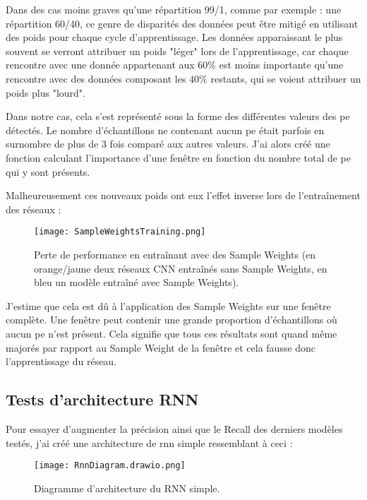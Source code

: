 Dans des cas moins graves qu'une répartition 99/1, comme par exemple : une répartition 60/40, ce genre de disparités
des données peut être mitigé en utilisant des poids pour chaque cycle d'apprentissage. Les données apparaissant le plus souvent 
se verront attribuer un poids "léger" lors de l'apprentissage, car chaque rencontre avec une donnée appartenant 
aux $60\%$ est moins importante qu'une rencontre avec des données composant les $40\%$ restants, qui se voient attribuer un poids plus "lourd".

Dans notre cas, cela s'est représenté sous la forme des différentes valeurs des \gls{pe} détectés. 
Le nombre d'échantillons ne contenant aucun \gls{pe} était parfois en surnombre de plus de 3 fois comparé aux autres valeurs. 
J'ai alors créé une fonction calculant l'importance d'une fenêtre en fonction du nombre total de \gls{pe} qui y sont présents.

Malheureusement ces nouveaux poids ont eux l'effet inverse lors de l'entraînement des réseaux :
\begin{figure}[tbph!]
	\centering
	\texttt{[image: SampleWeightsTraining.png]}
	\caption[Perte de performance en entraînant avec des Sample Weights]{Perte de performance en entraînant avec des Sample Weights (en orange/jaune deux réseaux CNN entraînés sans Sample Weights, en bleu un modèle entraîné avec Sample Weights).}
\end{figure}

J'estime que cela est dû à l'application des Sample Weights sur une fenêtre complète. Une fenêtre peut contenir 
une grande proportion d'échantillons où aucun \gls{pe} n'est présent. Cela signifie que tous ces résultats sont 
quand même majorés par rapport au Sample Weight de la fenêtre et cela fausse donc l'apprentissage du réseau.

\subsection{Tests d'architecture RNN}
Pour essayer d'augmenter la précision ainsi que le Recall des derniers modèles testés, j'ai créé une architecture de \gls{rnn} simple ressemblant à ceci :

\begin{figure}[tbph!]
	\centering
	\texttt{[image: RnnDiagram.drawio.png]}
	\caption[Diagramme d'architecture du RNN simple]{Diagramme d'architecture du RNN simple.}
\end{figure}

